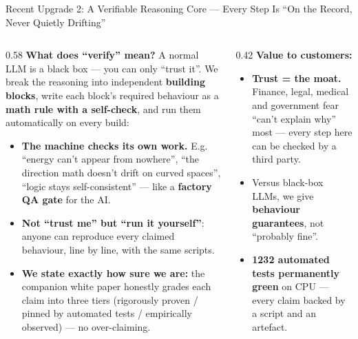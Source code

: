 ﻿\documentclass[aspectratio=169, 10pt]{beamer}
\begin{document}
\begin{frame}{Recent Upgrade 2: A Verifiable Reasoning Core --- Every Step Is ``On the Record, Never Quietly Drifting''}
\small
\begin{columns}
\begin{column}{0.58\textwidth}
\textbf{What does ``verify'' mean?} A normal LLM is a black box --- you can only ``trust it''. We break the reasoning into independent \textbf{building blocks}, write each block's required behaviour as a \textbf{math rule with a self-check}, and run them automatically on every build:
\begin{itemize}\itemsep=0.3em
    \item \textbf{The machine checks its own work.} E.g. ``energy can't appear from nowhere'', ``the direction math doesn't drift on curved spaces'', ``logic stays self-consistent'' --- like a \textbf{factory QA gate} for the AI.
    \item \textbf{Not ``trust me'' but ``run it yourself''}: anyone can reproduce every claimed behaviour, line by line, with the same scripts.
    \item \textbf{We state exactly how sure we are:} the companion white paper honestly grades each claim into three tiers (rigorously proven / pinned by automated tests / empirically observed) --- no over-claiming.
\end{itemize}
\end{column}
\begin{column}{0.42\textwidth}
\textbf{Value to customers:}
\begin{itemize}\itemsep=0.3em
    \item \textbf{Trust = the moat.} Finance, legal, medical and government fear ``can't explain why'' most --- every step here can be checked by a third party.
    \item Versus black-box LLMs, we give \textbf{behaviour guarantees}, not ``probably fine''.
    \item \textbf{1232 automated tests permanently green} on CPU --- every claim backed by a script and an artefact.
\end{itemize}
\end{column}
\end{columns}
\end{frame}
\end{document}
